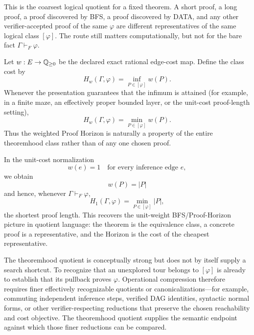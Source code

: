This is the coarsest logical quotient for a fixed theorem. A short proof, a long proof, a proof discovered by BFS, a proof discovered by DATA, and any other verifier-accepted proof of the same $\varphi$ are different representatives of the same logical class $[\varphi]$. The route still matters computationally, but not for the bare fact $\Gamma\vdash_F\varphi$.

\begin{corollary}
Let $w:E\to\mathbb{Q}_{\ge 0}$ be the declared exact rational edge-cost map. Define the class cost by
\[
H_w(\Gamma,\varphi)
=
\inf_{P\in[\varphi]} w(P).
\]
Whenever the presentation guarantees that the infimum is attained (for example, in a finite maze, an effectively proper bounded layer, or the unit-cost proof-length setting),
\[
H_w(\Gamma,\varphi)
=
\min_{P\in[\varphi]} w(P).
\]
Thus the weighted Proof Horizon is naturally a property of the entire theoremhood class rather than of any one chosen proof.
\end{corollary}

In the unit-cost normalization
\[
w(e)=1
\quad\text{for every inference edge }e,
\]
we obtain
\[
w(P)=|P|
\]
and hence, whenever $\Gamma\vdash_F\varphi$,
\[
H_1(\Gamma,\varphi)
=
\min_{P\in[\varphi]}|P|,
\]
the shortest proof length. This recovers the unit-weight BFS/Proof-Horizon picture in quotient language: the theorem is the equivalence class, a concrete proof is a representative, and the Horizon is the cost of the cheapest representative.

\begin{caution}
The theoremhood quotient is conceptually strong but does not by itself supply a search shortcut. To recognize that an unexplored tour belongs to $[\varphi]$ is already to establish that its pullback proves $\varphi$. Operational compression therefore requires finer effectively recognizable quotients or canonicalizations---for example, commuting independent inference steps, verified DAG identities, syntactic normal forms, or other verifier-respecting reductions that preserve the chosen reachability and cost objective. The theoremhood quotient supplies the semantic endpoint against which those finer reductions can be compared.
\end{caution}
